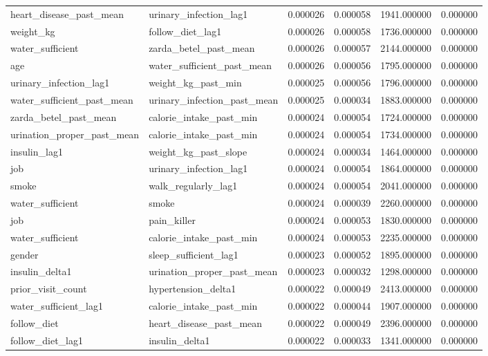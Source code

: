 \begin{longtable}{llrrrr}
heart\_disease\_past\_mean & urinary\_infection\_lag1 & 0.000026 & 0.000058 & 1941.000000 & 0.000000 \\
weight\_kg & follow\_diet\_lag1 & 0.000026 & 0.000058 & 1736.000000 & 0.000000 \\
water\_sufficient & zarda\_betel\_past\_mean & 0.000026 & 0.000057 & 2144.000000 & 0.000000 \\
age & water\_sufficient\_past\_mean & 0.000026 & 0.000056 & 1795.000000 & 0.000000 \\
urinary\_infection\_lag1 & weight\_kg\_past\_min & 0.000025 & 0.000056 & 1796.000000 & 0.000000 \\
water\_sufficient\_past\_mean & urinary\_infection\_past\_mean & 0.000025 & 0.000034 & 1883.000000 & 0.000000 \\
zarda\_betel\_past\_mean & calorie\_intake\_past\_min & 0.000024 & 0.000054 & 1724.000000 & 0.000000 \\
urination\_proper\_past\_mean & calorie\_intake\_past\_min & 0.000024 & 0.000054 & 1734.000000 & 0.000000 \\
insulin\_lag1 & weight\_kg\_past\_slope & 0.000024 & 0.000034 & 1464.000000 & 0.000000 \\
job & urinary\_infection\_lag1 & 0.000024 & 0.000054 & 1864.000000 & 0.000000 \\
smoke & walk\_regularly\_lag1 & 0.000024 & 0.000054 & 2041.000000 & 0.000000 \\
water\_sufficient & smoke & 0.000024 & 0.000039 & 2260.000000 & 0.000000 \\
job & pain\_killer & 0.000024 & 0.000053 & 1830.000000 & 0.000000 \\
water\_sufficient & calorie\_intake\_past\_min & 0.000024 & 0.000053 & 2235.000000 & 0.000000 \\
gender & sleep\_sufficient\_lag1 & 0.000023 & 0.000052 & 1895.000000 & 0.000000 \\
insulin\_delta1 & urination\_proper\_past\_mean & 0.000023 & 0.000032 & 1298.000000 & 0.000000 \\
prior\_visit\_count & hypertension\_delta1 & 0.000022 & 0.000049 & 2413.000000 & 0.000000 \\
water\_sufficient\_lag1 & calorie\_intake\_past\_min & 0.000022 & 0.000044 & 1907.000000 & 0.000000 \\
follow\_diet & heart\_disease\_past\_mean & 0.000022 & 0.000049 & 2396.000000 & 0.000000 \\
follow\_diet\_lag1 & insulin\_delta1 & 0.000022 & 0.000033 & 1341.000000 & 0.000000 \\

\end{longtable}
